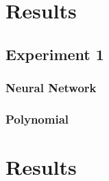 \section{Results}
\subsection{Experiment 1}


\subsubsection{Neural Network}

\subsubsection{Polynomial}

\section{Results}
